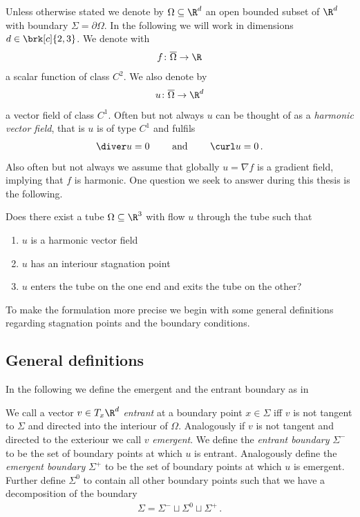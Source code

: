 Unless otherwise stated we denote by $\Omega\subseteq\R^d$ an open bounded subset of $\R^d$ with boundary $\Sigma=\partial\Omega$.
In the following we will work in dimensions $d\in\brk[c]{2,3}$.
We denote with
\begin{align*}
  f\colon\overline{\Omega}\to\R
\end{align*}
a scalar function of class $C^2$. We also denote by
\begin{align*}
  u\colon\overline{\Omega}\to\R^d
\end{align*}
a vector field of class $C^1$. Often but not always $u$ can be thought of as 
a \emph{harmonic vector field}, that is $u$ is of type $C^1$ and fulfils
\begin{align*}
  \diver u=0 \qquad \text{ and }\qquad \curl u=0\,.
\end{align*}
Also often but not always we assume that globally $u=\nabla f$ is a gradient field, implying that $f$ is harmonic.
One question we seek to answer during this thesis is the following.
\begin{question}\label{qu:flowthroughStagnationPoint}
  Does there exist a tube $\Omega\subseteq\R^3$ with flow $u$ through the tube such that
  \begin{enumerate}
    \item $u$ is a harmonic vector field
    \item $u$ has an interiour stagnation point
    \item $u$ enters the tube on the one end and exits the tube on the other?
  \end{enumerate}
\end{question}
To make the formulation more precise we begin with some general definitions regarding stagnation points and the boundary conditions.

\subsection{General definitions}

In the following we define the emergent and the entrant boundary as in \cite[p.282]{Morse1970}
\begin{definition}
  We call a vector $v\in T_x\R^d$ \emph{entrant} at a boundary point $x\in\Sigma$ iff $v$ is not tangent to $\Sigma$
  and directed into the interiour of $\Omega$. Analogously if $v$ is not tangent and
  directed to the exteriour we call $v$ \emph{emergent}.
  We define the \emph{entrant boundary} $\Sigma^-$ to be the set of boundary points at which $u$ is entrant.
  Analogously define the \emph{emergent boundary} $\Sigma^+$ to be the set of boundary points at which
  $u$ is emergent.
  Further define $\Sigma^0$ to contain all other boundary points such that we have a decomposition
  of the boundary
  \begin{align*}
    \Sigma=\Sigma^-\sqcup\Sigma^0\sqcup\Sigma^+\,.
  \end{align*}
\end{definition}

